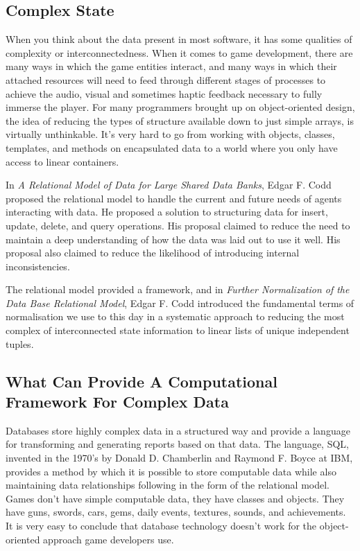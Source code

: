\documentclass[a4paper,12pt]{article}
\begin{document}
\subsection{Complex State}

When you think about the data present in most software, it has some qualities of complexity or interconnectedness.
When it comes to game development, there are many ways in which the game entities interact, and many ways in which their attached resources will need to feed through different stages of processes to achieve the audio, visual and sometimes haptic feedback necessary to fully immerse the player.
For many programmers brought up on object-oriented design, the idea of reducing the types of structure available down to just simple arrays, is virtually unthinkable.
It's very hard to go from working with objects, classes, templates, and methods on encapsulated data to a world where you only have access to linear containers.

In \textit{A Relational Model of Data for Large Shared Data Banks}, Edgar F. Codd proposed the relational model to handle the current and future needs of agents interacting with data.
He proposed a solution to structuring data for insert, update, delete, and query operations.
His proposal claimed to reduce the need to maintain a deep understanding of how the data was laid out to use it well.
His proposal also claimed to reduce the likelihood of introducing internal inconsistencies.

The relational model provided a framework, and in \textit{Further Normalization of the Data Base Relational Model}, Edgar F. Codd introduced the fundamental terms of normalisation we use to this day in a systematic approach to reducing the most complex of interconnected state information to linear lists of unique independent tuples.

\subsection{What Can Provide A Computational Framework For Complex Data}

Databases store highly complex data in a structured way and provide a language for transforming and generating reports based on that data.
The language, SQL, invented in the 1970's by Donald D. Chamberlin and Raymond F. Boyce at IBM, provides a method by which it is possible to store computable data while also maintaining data relationships following in the form of the relational model.
Games don't have simple computable data, they have classes and objects.
They have guns, swords, cars, gems, daily events, textures, sounds, and achievements.
It is very easy to conclude that database technology doesn't work for the object-oriented approach game developers use.
\end{document}
